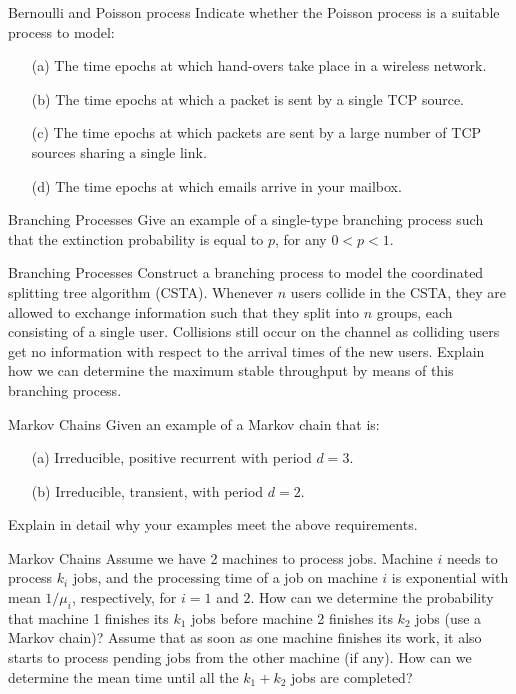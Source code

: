 \begin{problem}{Bernoulli and Poisson process}
Indicate whether the Poisson process is a suitable process to model:
\begin{itemize}
\item[(a)] The time epochs at which hand-overs take place in a wireless network.
\item[(b)] The time epochs at which a packet is sent by a single TCP source.
\item[(c)] The time epochs at which packets are sent by a large number of TCP sources sharing a single link.
\item[(d)] The time epochs at which emails arrive in your mailbox.
\end{itemize}
\end{problem}

\begin{problem}{Branching Processes}
Give an example of a single-type branching process such that
the extinction probability is equal to $p$, for any $0 < p < 1$.
\end{problem}

\begin{problem}{Branching Processes}
Construct a branching process to model the coordinated splitting tree algorithm (CSTA). Whenever $n$ users collide in the CSTA, they are allowed to exchange information such that they split into $n$ groups, each consisting of a single user. Collisions still occur on the channel as colliding users get no information with respect to the arrival times of the new users. Explain how we can determine the maximum stable throughput by means of this branching process.
\end{problem}

\begin{problem}{Markov Chains}
Given an example of a Markov chain that is:
\begin{itemize}
    \item[(a)] Irreducible, positive recurrent with period $d = 3$.
    \item[(b)] Irreducible, transient, with period $d = 2$.
\end{itemize}
Explain in detail why your examples meet the above requirements.
\end{problem}

\begin{problem}{Markov Chains}
Assume we have 2 machines to process jobs. Machine $i$ needs to process $k_i$ jobs, and the processing time of a job on machine $i$ is exponential with mean $1/\mu_i$, respectively, for $i = 1$ and $2$. How can we determine the probability that machine 1 finishes its $k_1$ jobs before machine 2 finishes its $k_2$ jobs (use a Markov chain)? Assume that as soon as one machine finishes its work, it also starts to process pending jobs from the other machine (if any). How can we determine the mean time until all the $k_1 + k_2$ jobs are completed?
\end{problem}

